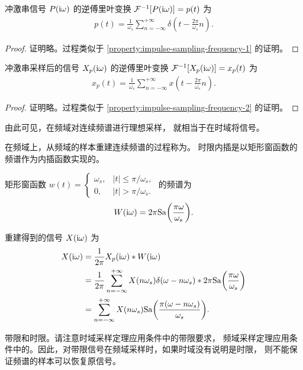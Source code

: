 \begin{property}
    冲激串信号 $P(\mathrm{i}\omega)$ 的逆傅里叶变换 $\mathcal{F}^{-1}[P(\mathrm{i}\omega)] = p(t)$ 为
    \begin{align*}
        p(t) = \frac{1}{\omega_s}\sum_{n = -\infty}^{+\infty}\delta(t - \frac{2\pi}{\omega_s}n).
    \end{align*}
\end{property}

\begin{proof}
    证明略。过程类似于 \ref{property:impulse-sampling-frequency-1} 的证明。
\end{proof}

\begin{property}
    冲激串采样后的信号 $X_p(\mathrm{i}\omega)$ 的逆傅里叶变换 $\mathcal{F}^{-1}[X_p(\mathrm{i}\omega)] = x_p(t)$ 为
    \begin{align*}
        x_p(t) = \frac{1}{\omega_s}\sum_{n = -\infty}^{+\infty}x(t - \frac{2\pi}{\omega_s}n).
    \end{align*}
\end{property}

\begin{proof}
    证明略。过程类似于 \ref{property:impulse-sampling-frequency-2} 的证明。
\end{proof}

\begin{remark}
    由此可见，在频域对连续频谱进行理想采样，
    就相当于在时域将信号。
\end{remark}

\begin{definition}[时限内插]
    在频域上，从频域的样本重建连续频谱的过程称为。
    时限内插是以矩形窗函数的频谱作为内插函数实现的。

    矩形窗函数 $w(t) = \begin{cases}
        \omega_s, & |t| \le \pi/\omega_s, \\
        0, & |t| > \pi/\omega_s.
    \end{cases}$ 的频谱为
    \begin{align*}
        W(\mathrm{i}\omega) = 2\pi \mathrm{Sa}{\left(\frac{\pi\omega}{\omega_s}\right)}.
    \end{align*}

    重建得到的信号 $X(\mathrm{i}\omega)$ 为
    \begin{align*}
        X(\mathrm{i}\omega) & = \frac{1}{2\pi}X_p(\mathrm{i}\omega) * W(\mathrm{i}\omega) \\
        & = \frac{1}{2\pi} \sum_{n = -\infty}^{+\infty}X(n\omega_s)\delta(\omega - n\omega_s) * 2\pi\mathrm{Sa}{\left(\frac{\pi\omega}{\omega_s}\right)} \\
        & = \sum_{n = -\infty}^{+\infty}X(n\omega_s)\mathrm{Sa}{\left(\frac{\pi(\omega - n\omega_s)}{\omega_s}\right)}.
    \end{align*}
\end{definition}

\begin{note}
    带限和时限。请注意时域采样定理应用条件中的{带限要求}，
    频域采样定理应用条件中的。因此，对带限信号在频域采样时，如果时域没有说明是时限，
    则不能保证频谱的样本可以恢复原信号。
\end{note}
